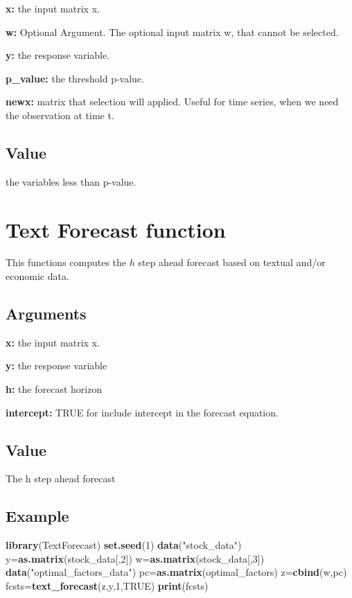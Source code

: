 \documentclass[]{article}
\newenvironment{Shaded}{\begin{snugshade}}{\end{snugshade}}
\newcommand{\KeywordTok}[1]{\textcolor[rgb]{0.13,0.29,0.53}{\textbf{#1}}}
\newcommand{\DecValTok}[1]{\textcolor[rgb]{0.00,0.00,0.81}{#1}}
\newcommand{\StringTok}[1]{\textcolor[rgb]{0.31,0.60,0.02}{#1}}
\newcommand{\OtherTok}[1]{\textcolor[rgb]{0.56,0.35,0.01}{#1}}
\newcommand{\NormalTok}[1]{#1}
\begin{document}
\textbf{x:} the input matrix x.

\textbf{w:} Optional Argument. The optional input matrix w, that cannot
be selected.

\textbf{y:} the response variable.

\textbf{p\_value:} the threshold p-value.

\textbf{newx:} matrix that selection will applied. Useful for time
series, when we need the observation at time t.

\subsection{Value}\label{value-7}

the variables less than p-value.

\section{Text Forecast function}\label{text-forecast-function}

This functions computes the \(h\) step ahead forecast based on textual
and/or economic data.

\subsection{Arguments}\label{arguments-8}

\textbf{x:} the input matrix x.

\textbf{y:} the response variable

\textbf{h:} the forecast horizon

\textbf{intercept:} TRUE for include intercept in the forecast equation.

\subsection{Value}\label{value-8}

The h step ahead forecast

\subsection{Example}\label{example-7}

\begin{Shaded}
\begin{Highlighting}[]
\KeywordTok{library}\NormalTok{(TextForecast)}
\KeywordTok{set.seed}\NormalTok{(}\DecValTok{1}\NormalTok{)}
\KeywordTok{data}\NormalTok{(}\StringTok{"stock_data"}\NormalTok{)}
\NormalTok{y=}\KeywordTok{as.matrix}\NormalTok{(stock_data[,}\DecValTok{2}\NormalTok{])}
\NormalTok{w=}\KeywordTok{as.matrix}\NormalTok{(stock_data[,}\DecValTok{3}\NormalTok{])}
\KeywordTok{data}\NormalTok{(}\StringTok{"optimal_factors_data"}\NormalTok{)}
\NormalTok{pc=}\KeywordTok{as.matrix}\NormalTok{(optimal_factors)}
\NormalTok{z=}\KeywordTok{cbind}\NormalTok{(w,pc)}
\NormalTok{fcsts=}\KeywordTok{text_forecast}\NormalTok{(z,y,}\DecValTok{1}\NormalTok{,}\OtherTok{TRUE}\NormalTok{)}
\KeywordTok{print}\NormalTok{(fcsts)}
\end{Highlighting}
\end{Shaded}
\end{document}

